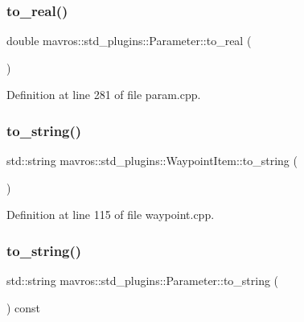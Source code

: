 \subsubsection{\texorpdfstring{to\_real()}{to\_real()}}
{\footnotesize\ttfamily double mavros\+::std\+\_\+plugins\+::\+Parameter\+::to\+\_\+real (\begin{DoxyParamCaption}{ }\end{DoxyParamCaption})\hspace{0.3cm}{\ttfamily [inline]}}



Definition at line 281 of file param.\+cpp.

\mbox{\label{group__plugin_ga6eeb2ff1ea806b477e297f08f356115a}} 
\subsubsection{\texorpdfstring{to\_string()}{to\_string()}\hspace{0.1cm}{\footnotesize\ttfamily [1/2]}}
{\footnotesize\ttfamily std\+::string mavros\+::std\+\_\+plugins\+::\+Waypoint\+Item\+::to\+\_\+string (\begin{DoxyParamCaption}{ }\end{DoxyParamCaption})\hspace{0.3cm}{\ttfamily [inline]}}



Definition at line 115 of file waypoint.\+cpp.

\mbox{\label{group__plugin_ga37cec503b8ebce4ccf83c34b3cc1a5c3}} 
\subsubsection{\texorpdfstring{to\_string()}{to\_string()}\hspace{0.1cm}{\footnotesize\ttfamily [2/2]}}
{\footnotesize\ttfamily std\+::string mavros\+::std\+\_\+plugins\+::\+Parameter\+::to\+\_\+string (\begin{DoxyParamCaption}{ }\end{DoxyParamCaption}) const\hspace{0.3cm}{\ttfamily [inline]}}



